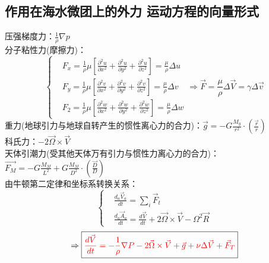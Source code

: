 \documentclass[a4paper,12pt]{article}
\begin{document}
    \subsection{作用在海水微团上的外力 运动方程的向量形式}
    压强梯度力：$\displaystyle\frac{1}{\rho}\nabla p$\\
    分子粘性力(摩擦力)：
    \[
        \left\{
        \begin{aligned}
            &F_{x}=\frac{1}{\rho} \mu\left[\frac{\partial^{2} u}{\partial x^{2}}+\frac{\partial^{2} u}{\partial y^{2}}+\frac{\partial^{2} u}{\partial z^{2}}\right]=\frac{\mu}{\rho} \Delta u\\
            &F_{y}=\frac{1}{\rho} \mu\left[\frac{\partial^{2} v}{\partial x^{2}}+\frac{\partial^{2} v}{\partial y^{2}}+\frac{\partial^{2} v}{\partial z^{2}}\right]=\frac{\mu}{\rho} \Delta v\\
            &F_{2}=\frac{1}{\rho} \mu\left[\frac{\partial^{2} w}{\partial x^{2}}+\frac{\partial^{2} w}{\partial y^{2}}+\frac{\partial^{2} w}{\partial z^{2}}\right]=\frac{\mu}{\rho} \Delta w
        \end{aligned}
        \right.
        \Rightarrow \vec{F}=\frac{\mu}{\rho}\Delta \vec{V}=\gamma\Delta\vec{v}
    \]
    重力(地球引力与地球自转产生的惯性离心力的合力)：$\displaystyle\vec{g}=-G\frac{M_g}{r^2}\cdot\left(\frac{\vec{r}}{r}\right)$\\
    科氏力：$\displaystyle -2\vec{\Omega}\times\vec{V}$\\
    天体引潮力(受其他天体万有引力与惯性力离心力的合力)：$\displaystyle\vec{F_M}=-G\frac{M_M}{L^2}+G\frac{M_M}{D^2}\cdot\left(\frac{\vec{D}}{D}\right)$\\
    由牛顿第二定律和坐标系转换关系：
    \[
        \left\{
        \begin{aligned}
            &\frac{d_{a} \vec{V}_{a}}{d t}=\sum_{i} \vec{F}_{t}\\
            &\frac{d_{a} \vec{A}_{a}}{d t}=\frac{d \vec{V}}{d t}+2 \vec{\Omega} \times \vec{V}-\Omega^{2} \vec{R}
        \end{aligned}
        \right.
    \]
    \[
        \Rightarrow\boxed{\color{red} \frac{d \vec{V}}{d t}=-\frac{1}{\rho} \nabla P-2 \vec{\Omega} \times \vec{V}+\vec{g} +\nu \Delta \vec{V}+\vec{F}_{T}}
    \]
\end{document}
